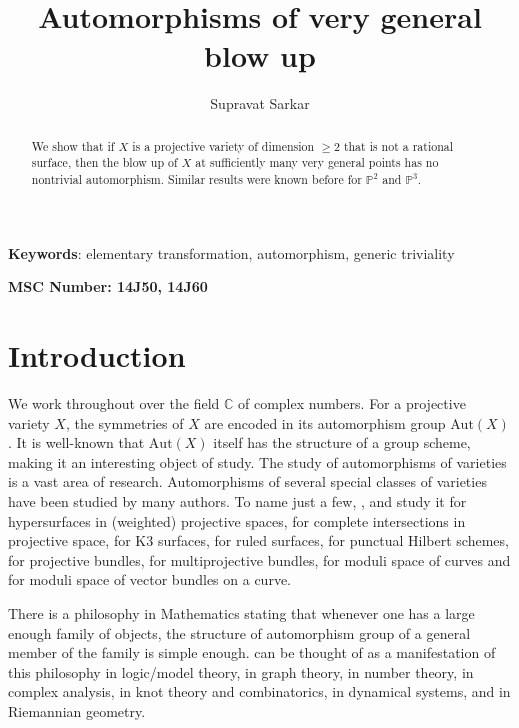 \documentclass[11pt,letterpaper]{amsart}
\title{Automorphisms of very general blow up}
\author{\small{Supravat Sarkar}}
\date{}
\begin{document}
\begin{abstract}
   We show that if $X$ is a projective variety of dimension $\geq 2$ that is not a rational surface, then the blow up of $X$ at sufficiently many very general points has no nontrivial automorphism. Similar results were known before for $\mathbb{P}^2$ and $\mathbb{P}^3.$
\end{abstract}
\maketitle
\begin{center}
\textbf{Keywords}: elementary transformation, automorphism, generic triviality
\end{center}
\begin{center}
\textbf{MSC Number: 14J50, 14J60} 
\end{center}

\section{Introduction}
We work throughout over the field $\mathbb{C}$ of complex numbers. For a projective variety $X$, the symmetries of $X$ are encoded in its automorphism group $\text{Aut}(X)$. It is well-known that $\text{Aut}(X)$ itself has the structure of a group scheme, making it an interesting object of study. The study of automorphisms of varieties is a vast area of research. Automorphisms of several special classes of varieties have been studied by many authors. To name just a few, \cite{matsumura1963automorphisms},\cite{esser2024automorphisms} and \cite{esser2025hypersurfaces} study it for hypersurfaces in (weighted) projective spaces, \cite{lyu2024generic} for complete intersections in projective space, \cite{mcmullen2016automorphisms} for K3 surfaces, \cite{maruyama1971automorphism} for ruled surfaces, \cite{bansal2025automorphisms} for punctual Hilbert schemes, \cite{kollar2024automorphisms} for projective bundles, \cite{bansal2026isomorphisms} for multiprojective bundles, \cite{massarenti2013automorphisms} for moduli space of curves and \cite{kouvidakis1993automorphism} for moduli space of vector bundles on a curve.

There is a philosophy in Mathematics stating that whenever one has a large enough family of objects, the structure of automorphism group of a general member of the family is simple enough. \cite{ghadernezhad2015automorphism} can be thought of as a manifestation of this philosophy in logic/model theory, \cite[Theorem 1]{wright1974asymmetric} in graph theory, \cite{bhargava2025galois} in number theory, \cite{greene1982automorphism} in complex analysis, \cite{chapman2020asymptotic} in knot theory and combinatorics, \cite{bonatti2009c} in dynamical systems, \cite{ebin1970manifold} and \cite{mounoud2015metrics} in Riemannian geometry.
\end{document}
